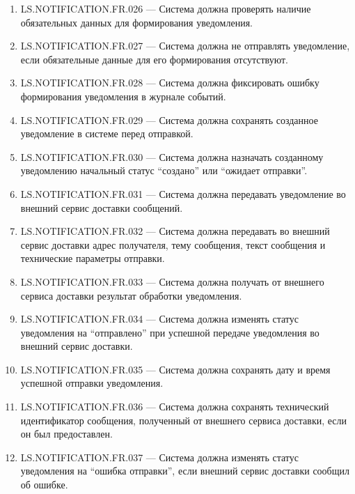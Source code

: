 \documentclass[12pt,a4paper]{article}
\begin{document}
\begin{enumerate}
		\item LS.NOTIFICATION.FR.026 --- Система должна проверять наличие обязательных
		данных для формирования уведомления.
		
		\item LS.NOTIFICATION.FR.027 --- Система должна не отправлять уведомление, если
		обязательные данные для его формирования отсутствуют.
		
		\item LS.NOTIFICATION.FR.028 --- Система должна фиксировать ошибку формирования
		уведомления в журнале событий.
		
		\item LS.NOTIFICATION.FR.029 --- Система должна сохранять созданное уведомление
		в системе перед отправкой.
		
		\item LS.NOTIFICATION.FR.030 --- Система должна назначать созданному уведомлению
		начальный статус ``создано'' или ``ожидает отправки''.
		
		\item LS.NOTIFICATION.FR.031 --- Система должна передавать уведомление во внешний
		сервис доставки сообщений.
		
		\item LS.NOTIFICATION.FR.032 --- Система должна передавать во внешний сервис
		доставки адрес получателя, тему сообщения, текст сообщения и технические параметры
		отправки.
		
		\item LS.NOTIFICATION.FR.033 --- Система должна получать от внешнего сервиса доставки
		результат обработки уведомления.
		
		\item LS.NOTIFICATION.FR.034 --- Система должна изменять статус уведомления на
		``отправлено'' при успешной передаче уведомления во внешний сервис доставки.
		
		\item LS.NOTIFICATION.FR.035 --- Система должна сохранять дату и время успешной
		отправки уведомления.
		
		\item LS.NOTIFICATION.FR.036 --- Система должна сохранять технический идентификатор
		сообщения, полученный от внешнего сервиса доставки, если он был предоставлен.
		
		\item LS.NOTIFICATION.FR.037 --- Система должна изменять статус уведомления на
		``ошибка отправки'', если внешний сервис доставки сообщил об ошибке.
		

\end{enumerate}
\end{document}
